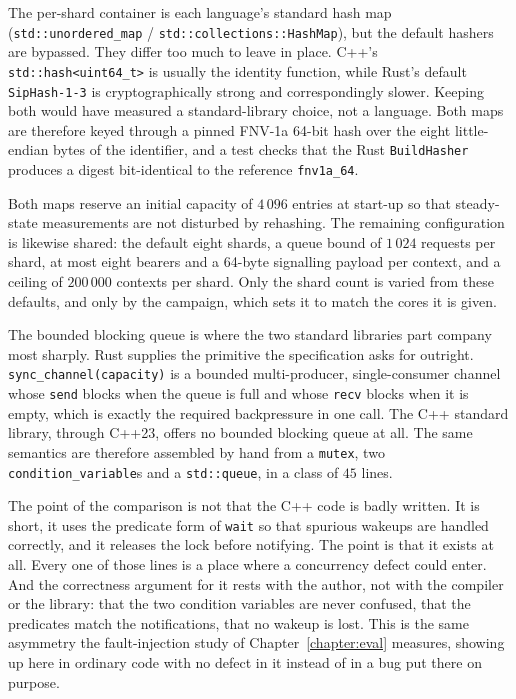 \documentclass[english,oneside,a4paper,censored,csm,software-track-2020]{HYthesisML}
\begin{document}
The per-shard container is each language's standard hash map (\texttt{std::unordered\_map} /
\texttt{std::collections::HashMap}), but the default hashers are bypassed. They differ too much
to leave in place. C++'s \texttt{std::hash<uint64\_t>} is usually the identity function, while
Rust's default \texttt{SipHash-1-3} is cryptographically strong and correspondingly slower.
Keeping both would have measured a standard-library choice, not a language. Both maps are
therefore keyed through a pinned FNV-1a 64-bit hash over the eight little-endian bytes of the
identifier, and a test checks that the Rust \texttt{BuildHasher} produces a digest bit-identical
to the reference \texttt{fnv1a\_64}.

Both maps reserve an initial capacity of $4\,096$ entries at start-up so that steady-state
measurements are not disturbed by rehashing. The remaining configuration is likewise shared:
the default eight shards, a queue bound of
$1\,024$ requests per shard, at most eight bearers and a 64-byte signalling payload per
context, and a ceiling of $200\,000$ contexts per shard. Only the shard count is varied from
these defaults, and only by the campaign, which sets it to match the cores it is given.

The bounded blocking queue is where the two standard libraries part company most sharply. Rust
supplies the primitive the specification asks for outright. \texttt{sync\_channel(capacity)} is
a bounded multi-producer, single-consumer channel whose \texttt{send} blocks when the queue is
full and whose \texttt{recv} blocks when it is empty, which is exactly the required
backpressure in one call. The C++ standard library, through C++23, offers no
bounded blocking queue at all. The same semantics are therefore assembled by hand from a
\texttt{mutex}, two \texttt{condition\_variable}s and a \texttt{std::queue}, in a class of $45$
lines.

The point of the comparison is not that the C++ code is badly written. It is short, it uses
the predicate form of \texttt{wait} so that spurious wakeups are handled correctly, and it
releases the lock before notifying. The point is that it exists at all. Every one of those lines
is a place where a concurrency defect could enter. And the correctness argument for it rests
with the author, not with the compiler or the library: that the two condition variables are
never confused, that the predicates match the notifications, that no wakeup is lost. This is the
same asymmetry the fault-injection study of Chapter~\ref{chapter:eval} measures, showing up here
in ordinary code with no defect in it instead of in a bug put there on purpose.
\end{document}
